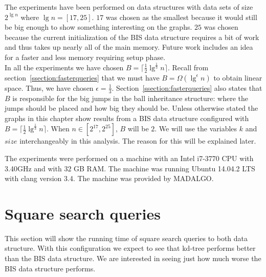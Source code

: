 The experiments have been performed on data structures with data sets of size $2^{\lg n}$ where $\lg n = [17,25]$. $17$ was chosen as the smallest because it would still be big enough to show something interesting on the graphs. $25$ was chosen because the current initialization of the BIS data structure requires a bit of work and thus takes up nearly all of the main memory. Future work includes an idea for a faster and less memory requiring setup phase.\\

In all the experiments we have chosen $B = \lceil \frac{1}{2}\lg^{\frac{1}{3}} n \rceil$. Recall from section~\ref{ssection:fasterqueries} that we must have $B = \Omega(\lg^\epsilon n)$ to obtain linear space. Thus, we have chosen $\epsilon = \frac{1}{3}$. Section~\ref{ssection:fasterqueries} also states that $B$ is responsible for the big jumps in the ball inheritance structure: where the jumps should be placed and how big they should be. Unless otherwise stated the graphs in this chapter show results from a BIS data structure configured with $B = \lceil \frac{1}{2}\lg^{\frac{1}{3}} n \rceil$. When $n \in [2^{17}, 2^{25}]$, $B$ will be $2$. We will use the variables $k$ and $size$ interchangeably in this analysis. The reason for this will be explained later.



The experiments were performed on a machine with an Intel i7-3770 CPU with 3.40GHz and with $32$ GB RAM. The machine was running Ubuntu 14.04.2 LTS with clang version 3.4. The machine was provided by MADALGO.



\section{Square search queries}
\label{sect:squares}

This section will show the running time of square search queries to both data structure. With this configuration we expect to see that kd-tree performs better than the BIS data structure. We are interested in seeing just how much worse the BIS data structure performs. 

